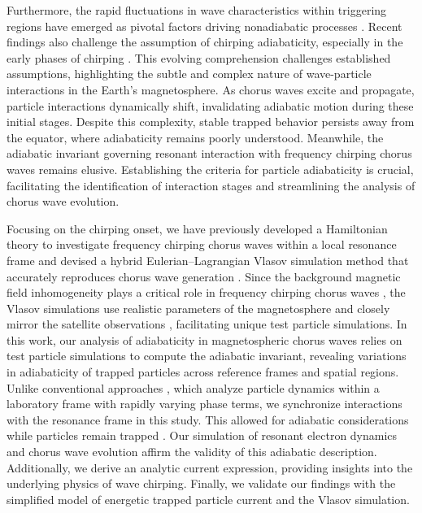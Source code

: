   Furthermore, the rapid fluctuations in wave characteristics within triggering regions have emerged as pivotal factors driving nonadiabatic processes
\cite{tao_trap-release-amplify_2021}. 
Recent findings also challenge the assumption of chirping adiabaticity, especially in the early phases of chirping
\cite{bierwage2021}. 
This evolving comprehension challenges established assumptions, highlighting the subtle and complex nature of wave-particle interactions in the Earth's magnetosphere. 
As chorus waves excite and propagate, particle interactions dynamically shift, invalidating adiabatic motion during these initial stages. Despite this complexity, stable trapped behavior persists away from the equator, where adiabaticity remains poorly understood. Meanwhile, the adiabatic invariant governing resonant interaction with frequency chirping chorus waves remains elusive. Establishing the  criteria for particle adiabaticity is crucial, facilitating the identification of interaction stages and streamlining the analysis of chorus wave evolution.


Focusing on the chirping onset,  we  have  previously developed a Hamiltonian theory to investigate frequency chirping chorus waves within a local resonance frame \cite{zheng2024}  and devised a hybrid Eulerian–Lagrangian Vlasov simulation method that accurately reproduces chorus wave generation \cite{zheng2023b}. 
Since  the background magnetic field inhomogeneity  plays a critical role  in frequency chirping chorus waves \cite{wu2023,wu_controlling_2020}, the Vlasov simulations use  realistic parameters of the magnetosphere and closely mirror the satellite observations \cite{zheng2024,zheng2023b}, facilitating unique test particle simulations. 
In this work, our analysis of adiabaticity in magnetospheric chorus waves relies on test particle simulations to compute the adiabatic invariant, revealing variations in  adiabaticity of trapped particles across reference frames and spatial regions.  
Unlike conventional approaches \cite{huanghua_test_ptc,omura_test_ptc,tao_test_ptc}, which analyze particle dynamics within a laboratory frame with rapidly varying phase terms, we synchronize interactions with the resonance frame in this study. This allowed for adiabatic considerations while particles remain trapped \cite{CARY1989287}. 
Our simulation of resonant electron dynamics and chorus wave evolution affirm the validity of this adiabatic description. 
Additionally, we derive an analytic current expression, providing insights into the underlying physics of wave chirping. 
Finally, we validate our findings with the simplified model of energetic trapped particle current and the Vlasov simulation.

